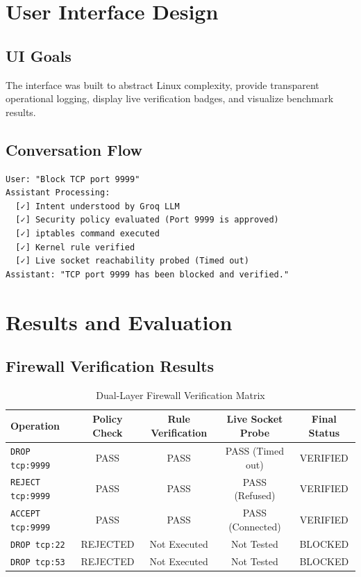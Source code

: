 \documentclass[11pt,a4paper]{article}
\begin{document}
\section{User Interface Design}

\subsection{UI Goals}
The interface was built to abstract Linux complexity, provide transparent operational logging, display live verification badges, and visualize benchmark results.

\subsection{Conversation Flow}
\begin{verbatim}
User: "Block TCP port 9999"
Assistant Processing:
  [✓] Intent understood by Groq LLM
  [✓] Security policy evaluated (Port 9999 is approved)
  [✓] iptables command executed
  [✓] Kernel rule verified
  [✓] Live socket reachability probed (Timed out)
Assistant: "TCP port 9999 has been blocked and verified."
\end{verbatim}

\section{Results and Evaluation}

\subsection{Firewall Verification Results}
\begin{table}[h]
\centering
\small
\begin{tabularx}{\textwidth}{lcccc}
\toprule
\textbf{Operation} & \textbf{Policy Check} & \textbf{Rule Verification} & \textbf{Live Socket Probe} & \textbf{Final Status} \\
\midrule
\texttt{DROP tcp:9999} & PASS & PASS & PASS (Timed out) & VERIFIED \\
\texttt{REJECT tcp:9999} & PASS & PASS & PASS (Refused) & VERIFIED \\
\texttt{ACCEPT tcp:9999} & PASS & PASS & PASS (Connected) & VERIFIED \\
\texttt{DROP tcp:22} & REJECTED & Not Executed & Not Tested & BLOCKED \\
\texttt{DROP tcp:53} & REJECTED & Not Executed & Not Tested & BLOCKED \\
\bottomrule
\end{tabularx}
\caption{Dual-Layer Firewall Verification Matrix}
\end{table}
\end{document}
